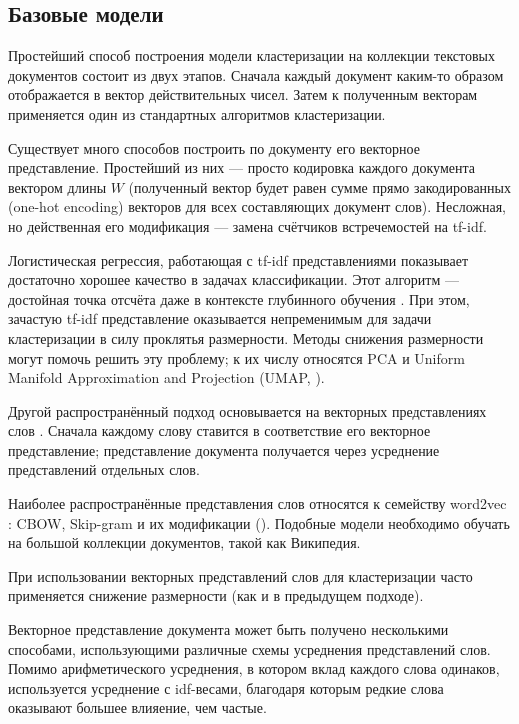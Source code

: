 \subsection{Базовые модели}


\par Простейший способ построения модели кластеризации на коллекции текстовых документов состоит из двух этапов. Сначала каждый документ каким-то образом отображается в вектор действительных чисел. Затем к полученным векторам применяется один из стандартных алгоритмов кластеризации.

\par Существует много способов построить по документу его векторное представление. Простейший из них --- просто кодировка каждого документа вектором длины $W$ (полученный вектор будет равен сумме прямо закодированных (one-hot encoding) векторов для всех составляющих документ слов). Несложная, но действенная его модификация --- замена счётчиков встречемостей на tf-idf.

Логистическая регрессия, работающая с tf-idf представлениями показывает достаточно хорошее качество в задачах классификации. Этот алгоритм --- достойная точка отсчёта даже в контексте глубинного обучения \cite{park2019adc}. При этом, зачастую tf-idf представление оказывается непременимым для задачи кластеризации в силу проклятья размерности. Методы снижения размерности могут помочь решить эту проблему; к их числу относятся PCA и Uniform Manifold Approximation and Projection (UMAP, \cite{mcinnes2018umap}).

\par Другой распространённый подход основывается на векторных представлениях слов \cite{embeddings_in_tm}. Сначала каждому слову ставится в соответствие его векторное представление; представление документа получается через усреднение представлений отдельных слов.

Наиболее распространённые представления слов относятся к семейству word2vec \cite{word2vec}: CBOW, Skip-gram и их модификации (\cite{mikolov2013efficient}). 
Подобные модели необходимо обучать на большой коллекции документов, такой как Википедия.

При использовании векторных представлений слов для кластеризации часто применяется снижение размерности \cite{park2019adc} (как и в предыдущем подходе).

Векторное представление документа может быть получено несколькими способами, использующими различные схемы усреднения представлений слов. Помимо арифметического усреднения, в котором вклад каждого слова одинаков, используется усреднение с idf-весами, благодаря которым редкие слова оказывают большее влияение, чем частые.


